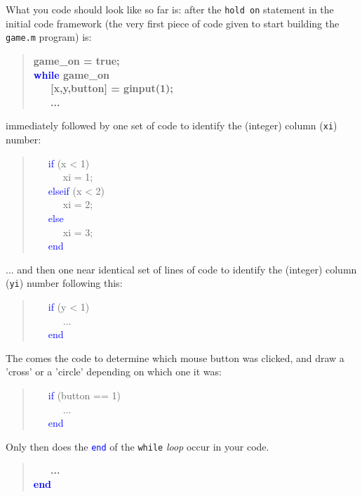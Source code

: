 \documentclass{tufte-book} %
\newenvironment{docspec}{\begin{quotation}\ttfamily\parskip0pt\parindent0pt\ignorespaces}{\end{quotation}}
\newenvironment{docspecbold}{\begin{quotation}\ttfamily\bfseries\parskip0pt\parindent0pt\ignorespaces}{\end{quotation}}
\begin{document}
What you code should look like so far is: after the \texttt{hold on} statement in the initial code framework (the very first piece of code given to start building the \texttt{game.m} program) is:
\begin{docspecbold}
game\_on = true;\\
\textcolor{blue}{while} game\_on\\
\ \ \    [x,y,button] = ginput(1);\\
\ \ \  ...
\end{docspecbold}
immediately followed by one set of code to identify the (integer) column (\texttt{xi}) number:
\vspace{-1mm}\begin{docspec}
\ \ \    \textcolor{blue}{if} (x < 1)\\
\ \ \ \ \ \             xi = 1;\\
\ \ \        \textcolor{blue}{elseif} (x < 2)\\
\ \ \ \ \ \             xi = 2;\\       
\ \ \        \textcolor{blue}{else}\\
\ \ \ \ \ \             xi = 3;\\
\ \ \        \textcolor{blue}{end}
\end{docspec}\vspace{-1mm}
... and then one near identical set of lines of code to identify the (integer) column  (\texttt{yi}) number following this:
\vspace{-1mm}\begin{docspec}
\ \ \    \textcolor{blue}{if} (y < 1)\\
\ \ \ \ \ \  ...\\
\ \ \        \textcolor{blue}{end}
\end{docspec}\vspace{-1mm}
The comes the code to determine which mouse button was clicked, and draw a 'cross' or a 'circle' depending on which one it was:
\vspace{-1mm}\begin{docspec}
\ \ \    \textcolor{blue}{if} (button == 1)\\
\ \ \ \ \ \  ...\\
\ \ \        \textcolor{blue}{end}
\end{docspec}\vspace{-1mm}

\noindent Only then does the \texttt{\textcolor{blue}{end}} of the \texttt{while} \textit{loop} occur in your code.
\begin{docspecbold}
\ \ \  ...\\
\textcolor{blue}{end}
\end{docspecbold}
\end{document}
